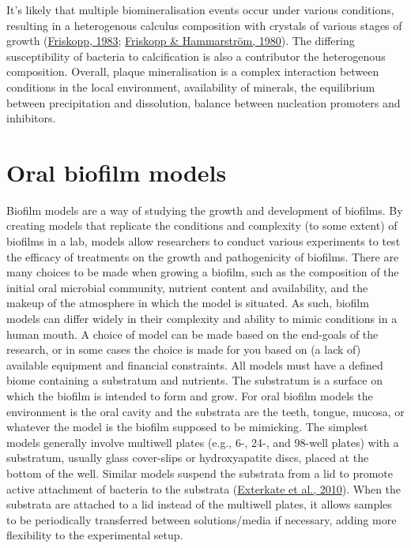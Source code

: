 \documentclass[
  letterpaper,
]{book}
\begin{document}
It's likely that multiple biomineralisation events occur under various
conditions, resulting in a heterogenous calculus composition with
crystals of various stages of growth
(\protect\hyperlink{ref-friskoppUltrastructureNondecalcified1983}{Friskopp,
1983}; \protect\hyperlink{ref-friskoppComparativeScanning1980}{Friskopp
\& Hammarström, 1980}). The differing susceptibility of bacteria to
calcification is also a contributor the heterogenous composition.
Overall, plaque mineralisation is a complex interaction between
conditions in the local environment, availability of minerals, the
equilibrium between precipitation and dissolution, balance between
nucleation promoters and inhibitors.

\hypertarget{background-biofilm-models}{%
\section{Oral biofilm models}\label{background-biofilm-models}}

Biofilm models are a way of studying the growth and development of
biofilms. By creating models that replicate the conditions and
complexity (to some extent) of biofilms in a lab, models allow
researchers to conduct various experiments to test the efficacy of
treatments on the growth and pathogenicity of biofilms. There are many
choices to be made when growing a biofilm, such as the composition of
the initial oral microbial community, nutrient content and availability,
and the makeup of the atmosphere in which the model is situated. As
such, biofilm models can differ widely in their complexity and ability
to mimic conditions in a human mouth. A choice of model can be made
based on the end-goals of the research, or in some cases the choice is
made for you based on (a lack of) available equipment and financial
constraints. All models must have a defined biome containing a
substratum and nutrients. The substratum is a surface on which the
biofilm is intended to form and grow. For oral biofilm models the
environment is the oral cavity and the substrata are the teeth, tongue,
mucosa, or whatever the model is the biofilm supposed to be mimicking.
The simplest models generally involve multiwell plates (e.g., 6-, 24-,
and 98-well plates) with a substratum, usually glass cover-slips or
hydroxyapatite discs, placed at the bottom of the well. Similar models
suspend the substrata from a lid to promote active attachment of
bacteria to the substrata
(\protect\hyperlink{ref-extercateAAA2010}{Exterkate et al., 2010}). When
the substrata are attached to a lid instead of the multiwell plates, it
allows samples to be periodically transferred between solutions/media if
necessary, adding more flexibility to the experimental setup.
\end{document}
